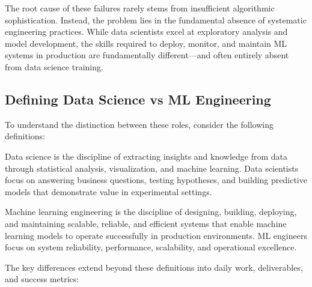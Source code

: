 The root cause of these failures rarely stems from insufficient algorithmic sophistication. Instead, the problem lies in the fundamental absence of systematic engineering practices. While data scientists excel at exploratory analysis and model development, the skills required to deploy, monitor, and maintain ML systems in production are fundamentally different—and often entirely absent from data science training.

\subsection{Defining Data Science vs ML Engineering}

To understand the distinction between these roles, consider the following definitions:

\begin{definition}
Data science is the discipline of extracting insights and knowledge from data through statistical analysis, visualization, and machine learning. Data scientists focus on answering business questions, testing hypotheses, and building predictive models that demonstrate value in experimental settings.
\end{definition}

\begin{definition}[ML Engineering]
Machine learning engineering is the discipline of designing, building, deploying, and maintaining scalable, reliable, and efficient systems that enable machine learning models to operate successfully in production environments. ML engineers focus on system reliability, performance, scalability, and operational excellence.
\end{definition}

The key differences extend beyond these definitions into daily work, deliverables, and success metrics:

